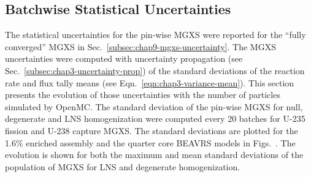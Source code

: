 
\subsection{Batchwise Statistical Uncertainties}
\label{subsec:chap9-batchwise-uncertainties}

The statistical uncertainties for the pin-wise \ac{MGXS} were reported for the ``fully converged'' \ac{MGXS} in Sec.~\ref{subsec:chap9-mgxs-uncertainty}. The \ac{MGXS} uncertainties were computed with uncertainty propagation (see Sec.~\ref{subsec:chap3-uncertainty-prop}) of the standard deviations of the reaction rate and flux tally means (see Eqn.~\ref{eqn:chap3-variance-mean}). This section presents the evolution of those uncertainties with the number of particles simulated by OpenMC. The standard deviation of the pin-wise \ac{MGXS} for null, degenerate and \ac{LNS} homogenization were computed every 20 batches for U-235 fission and U-238 capture \ac{MGXS}. The standard deviations are plotted for the 1.6\% enriched assembly and the quarter core \ac{BEAVRS} models in Figs.~. The evolution is shown for both the maximum and mean standard deviations of the population of \ac{MGXS} for \ac{LNS} and degenerate homogenization.

